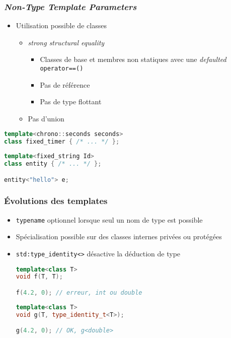 \documentclass[C++.tex]{subfiles}
\begin{document}
\begin{frame}[fragile]
	\frametitle{\textit{Non-Type Template Parameters}}
	\begin{itemize}
		\item Utilisation possible de classes
		\begin{itemize}
			\item \textit{strong structural equality}
			\begin{itemize}
				\item Classes de base et membres non statiques avec une \textit{defaulted} \lstinline|operator==()|
				\item Pas de référence
				\item Pas de type flottant
			\end{itemize}
			\item Pas d'union
		\end{itemize}
	\end{itemize}

	\begin{lstlisting}[language=C++]
template<chrono::seconds seconds>
class fixed_timer { /* ... */ };\end{lstlisting}


	\begin{lstlisting}[language=C++]
template<fixed_string Id>
class entity { /* ... */ };

entity<"hello"> e;\end{lstlisting}

\end{frame}

\begin{frame}[fragile]
	\frametitle{Évolutions des templates}
	\begin{itemize}
		\item \lstinline|typename| optionnel lorsque seul un nom de type est possible
		

		\item Spécialisation possible sur des classes internes privées ou protégées
		\item \lstinline|std:type_identity<>| désactive la déduction de type

		\begin{lstlisting}[language=C++]
template<class T>
void f(T, T);

f(4.2, 0); // erreur, int ou double\end{lstlisting}

		\begin{lstlisting}[language=C++]
template<class T>
void g(T, type_identity_t<T>);

g(4.2, 0); // OK, g<double>\end{lstlisting}
	\end{itemize}
\end{frame}
\end{document}
